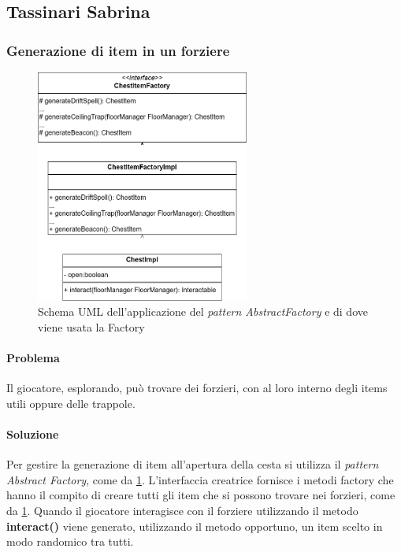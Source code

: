 \documentclass{report}
\begin{document}
\subsection{Tassinari Sabrina}

\subsubsection{Generazione di item in un forziere}

\begin{figure}[H]
    \centering
    \includegraphics[width=7cm]{patternFactory.drawio.png}
    \caption{Schema UML dell'applicazione del \textit{pattern AbstractFactory} e di dove viene usata la Factory}
    \label{img:chestItemFactory}
\end{figure}

\paragraph{Problema} Il giocatore, esplorando, può trovare dei forzieri, con al loro interno degli items utili oppure delle trappole. 

\paragraph{Soluzione} Per gestire la generazione di item all'apertura della cesta si utilizza il \textit{pattern Abstract Factory}, come da \ref{img:chestItemFactory}.
%
L'interfaccia creatrice fornisce i metodi factory che hanno il compito di creare tutti gli item che si possono trovare nei forzieri, come da \ref{img:chestItemFactory}. 
%
Quando il giocatore interagisce con il forziere utilizzando il metodo \textbf{interact()} viene generato, utilizzando il metodo opportuno, un item scelto in modo randomico tra tutti.
\end{document}
